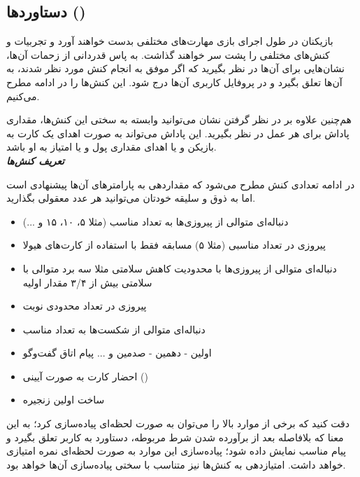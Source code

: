 \documentclass[]{article}
\begin{document}
\subsection*{{\titr دستاورد‌ها ()}}

بازیکنان در طول اجرای بازی مهارت‌های مختلفی بدست خواهند آورد و تجربیات و کنش‌های مختلفی را پشت سر خواهند گذاشت. به پاس قدردانی از زحمات آن‌ها، نشان‌هایی برای آن‌ها در نظر بگیرید که اگر موفق به انجام کنش مورد نظر شدند، به آن‌ها تعلق بگیرد و در پروفایل کاربری آن‌ها درج شود. این کنش‌ها را در ادامه مطرح می‌کنیم.

هم‌چنین علاوه بر در نظر گرفتن نشان می‌توانید وابسته به سختی این کنش‌ها، مقداری پاداش برای هر عمل در نظر بگیرید. این پاداش می‌تواند به صورت اهدای یک کارت به بازیکن و یا اهدای مقداری پول و یا امتیاز به او باشد.
\\

\textbf{\emph{تعریف کنش‌ها}}

در ادامه تعدادی کنش مطرح می‌شود که مقداردهی به پارامترهای آن‌ها پیشنهادی است اما به ذوق و سلیقه خودتان می‌توانید هر عدد معقولی بگذارید.

\begin{itemize}
	\item دنباله‌ای متوالی از پیروزی‌ها به تعداد مناسب‌ (مثلا ۵، ۱۰، ۱۵ و ...)
	\item پیروزی در تعداد مناسبی‌ (مثلا ۵) مسابقه فقط با استفاده از کارت‌های هیولا
	\item دنباله‌ای متوالی از پیروزی‌ها با محدودیت کاهش سلامتی مثلا سه برد متوالی با سلامتی بیش از ۳/۴ مقدار اولیه
	\item پیروزی در تعداد محدودی نوبت
	\item دنباله‌ای متوالی از شکست‌ها به تعداد مناسب
	\item اولین - دهمین - صدمین و ... پیام اتاق گفت‌وگو
	\item احضار کارت به صورت آیینی ()
	\item ساخت اولین زنجیره
\end{itemize}


\begin{tcolorbox}[colback=green!5!white,colframe=green!75!black,title=\textbf{نکته}]
	دقت کنید که برخی از موارد بالا را می‌توان به صورت لحظه‌ای  پیاده‌سازی کرد؛ به این معنا که بلافاصله بعد از برآورده شدن شرط مربوطه، دستاورد به کاربر تعلق بگیرد و پیام مناسب نمایش داده شود؛ پیاده‌سازی این موارد به صورت لحظه‌ای نمره امتیازی خواهد داشت. امتیازدهی به کنش‌ها نیز متناسب با سختی پیاده‌سازی آن‌ها خواهد بود.
\end{tcolorbox}
\end{document}

